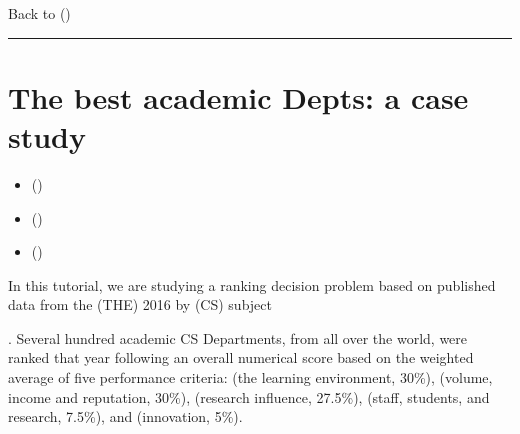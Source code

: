 \documentclass[a4paper,12pt,english]{sphinxhowto}
\begin{document}
Back to {\hyperref[\detokenize{tutorial:tutorial-label}]{}} ()


\bigskip\hrule\bigskip



\section{The best academic  Depts: a  case study}
\label{\detokenize{tutorial:the-best-academic-computer-science-depts-a-ranking-case-study}}\label{\detokenize{tutorial:theranking-tutorial-label}}
\begin{sphinxShadowBox}
\begin{itemize}
\item {} 
\label{\detokenize{tutorial:id270}}{\hyperref[\detokenize{tutorial:the-the-performance-tableau}]{}} ()

\item {} 
\label{\detokenize{tutorial:id271}}{\hyperref[\detokenize{tutorial:ranking-with-multiple-incommensurable-criteria-of-ordinal-significance}]{}} ()

\item {} 
\label{\detokenize{tutorial:id272}}{\hyperref[\detokenize{tutorial:how-to-judge-the-quality-of-a-ranking-result}]{}} ()

\end{itemize}
\end{sphinxShadowBox}

In this tutorial, we are studying a ranking decision problem based on published data from the  (THE)  2016 by  (CS) subject %
\begin{footnote}[36]\sphinxAtStartFootnote
{}
%
\end{footnote}. Several hundred academic CS Departments, from all over the world, were ranked that year following an overall numerical score based on the weighted average of five performance criteria:  (the learning environment, 30\%),  (volume, income and reputation, 30\%),  (research influence, 27.5\%),  (staff, students, and research, 7.5\%), and  (innovation, 5\%).
\end{document}
